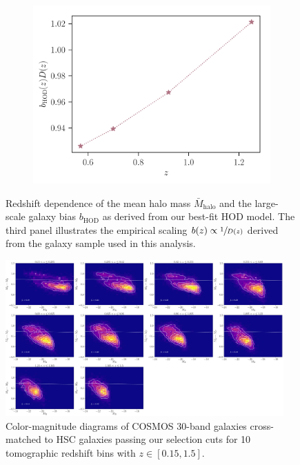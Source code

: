 \documentclass[a4paper,11pt]{article}
\begin{document}
\begin{figure}
\begin{center}
\begin{subfigure}{0.32\textwidth}
          \end{subfigure}
          \begin{subfigure}{0.32\textwidth}
          \includegraphics[width=\textwidth]{figures/bias-growth_mPk=HOD_fix=alpha-fc-sigmaM_HOD=zevol_fit=pz-shifts-pz-widths+prior=0p2_fit=auto+cross_cosmo=const_cov=G+NG+SSC-LINBIAS_HOD-param=zfid_clfit=HOD-zevol.pdf}
          \end{subfigure}
          \caption{Redshift dependence of the mean halo mass $\bar{M}_{\mathrm{halo}}$ and the large-scale galaxy bias $b_{\mathrm{HOD}}$ as derived from our best-fit HOD model. The third panel illustrates the empirical scaling $b(z) \propto \sfrac{1}{D(z)}$ derived from the galaxy sample used in this analysis.}
          \label{fig:HOD-redshift}
        \end{center}
      \end{figure}

      \begin{figure}
        \begin{center}
          \includegraphics[width=0.95\textwidth]{figures/color-magnitude_cut=COSMOS30_nbin=10_weights=True.pdf}
          \caption{Color-magnitude diagrams of COSMOS 30-band galaxies cross-matched to HSC galaxies passing our selection cuts for 10 tomographic redshift bins with $z \in [0.15, 1.5]$.}
          \label{fig:color-mag}
        \end{center}
      \end{figure}
      
\end{document}

